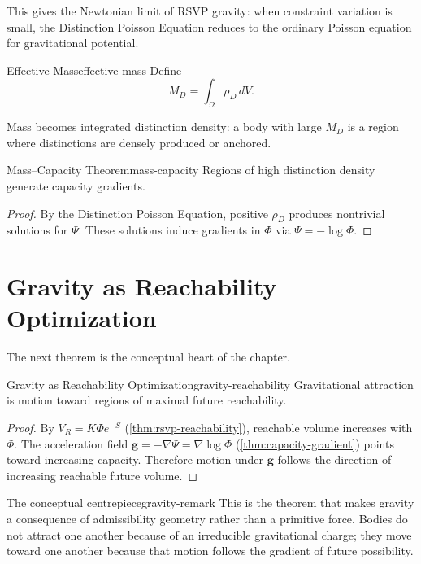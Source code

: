 \documentclass[12pt,twoside,openright]{book}
\begin{document}
This gives the Newtonian limit of RSVP gravity: when
constraint variation is small, the Distinction Poisson
Equation reduces to the ordinary Poisson equation for
gravitational potential.

\begin{definition}{Effective Mass}{effective-mass}
  Define
  \[
    M_D = \int_\Omega \rho_D \, dV.
  \]
\end{definition}

Mass becomes integrated distinction density: a body with
large $M_D$ is a region where distinctions are densely
produced or anchored.

\begin{theorem}{Mass--Capacity Theorem}{mass-capacity}
  Regions of high distinction density generate capacity
  gradients.
\end{theorem}

\begin{proof}
  By the Distinction Poisson Equation, positive $\rho_D$
  produces nontrivial solutions for $\Psi$. These solutions
  induce gradients in $\Phi$ via $\Psi = -\log\Phi$.
\end{proof}

\section{Gravity as Reachability Optimization}
\label{sec:ch17-optimization}

The next theorem is the conceptual heart of the chapter.

\begin{theorem}{Gravity as Reachability Optimization}{gravity-reachability}
  Gravitational attraction is motion toward regions of
  maximal future reachability.
\end{theorem}

\begin{proof}
  By $V_R = K\Phi e^{-S}$ (\cref{thm:rsvp-reachability}),
  reachable volume increases with $\Phi$. The acceleration
  field $\mathbf{g} = -\nabla\Psi = \nabla\log\Phi$
  (\cref{thm:capacity-gradient}) points toward increasing
  capacity. Therefore motion under $\mathbf{g}$ follows the
  direction of increasing reachable future volume.
\end{proof}

\begin{remark}{The conceptual centrepiece}{gravity-remark}
  This is the theorem that makes gravity a consequence of
  admissibility geometry rather than a primitive force.
  Bodies do not attract one another because of an
  irreducible gravitational charge; they move toward one
  another because that motion follows the gradient of
  future possibility.
\end{remark}
\end{document}
